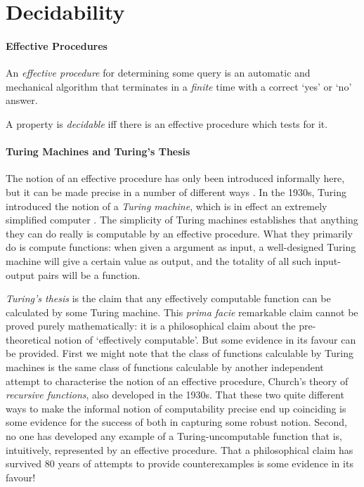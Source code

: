 \section{Decidability}\label{decide}
\paragraph{Effective Procedures}

An \emph{effective procedure} for determining some query is an automatic and mechanical algorithm that terminates in a \emph{finite} time with a correct `yes' or `no' answer. 

A property is \emph{decidable} iff there is an effective procedure which tests for it.



\paragraph{Turing Machines and Turing's Thesis} The notion of an effective procedure has only been introduced informally here, but it can be made precise in a number of different ways \citep[chs.\ 1–8]{bbjcomlo}. In the 1930s, Turing introduced the notion of a \emph{Turing machine}, which is in effect an extremely simplified computer \citep{turoncon}. The simplicity of Turing machines establishes that anything they can do really is computable by an effective procedure. What they primarily do is compute functions: when given a argument as input, a well-designed Turing machine will give a certain value as output, and the totality of all such input-output pairs will be a function.

\emph{Turing's thesis} is the claim that any effectively computable function can be calculated by some Turing machine. This \emph{prima facie} remarkable claim cannot be proved purely mathematically: it is a philosophical claim about the pre-theoretical notion of `effectively computable'. But some evidence in its favour can be provided. First we might note that the class of functions calculable by Turing machines is the same class of functions calculable by another independent attempt to characterise the notion of an effective procedure, Church's theory of \emph{recursive functions}, also developed in the 1930s. That these two quite different ways to make the informal notion of computability precise end up coinciding is some evidence for the success of both in capturing some robust notion. Second, no one has developed any example of a Turing-uncomputable function that is, intuitively, represented by an effective procedure. That a philosophical claim has survived 80 years of attempts to provide counterexamples is some evidence in its favour!


